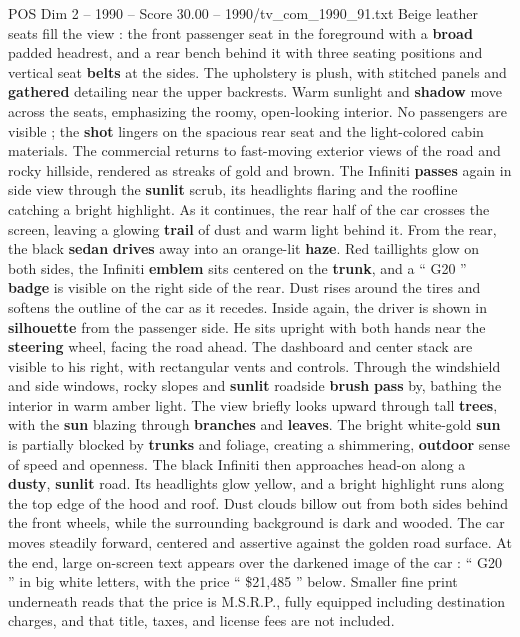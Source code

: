 \begin{textsample}{POS Dim 2 – 1990 – Score 30.00 – 1990/tv\_com\_1990\_91.txt}
Beige leather seats fill the view : the front passenger seat in the foreground with a \textbf{broad} padded headrest, and a rear bench behind it with three seating positions and vertical seat \textbf{belts} at the sides.
The upholstery is plush, with stitched panels and \textbf{gathered} detailing near the upper backrests.
Warm sunlight and \textbf{shadow} move across the seats, emphasizing the roomy, open-looking interior.
No passengers are visible ; the \textbf{shot} lingers on the spacious rear seat and the light-colored cabin materials.
The commercial returns to fast-moving exterior views of the road and rocky hillside, rendered as streaks of gold and brown.
The Infiniti \textbf{passes} again in side view through the \textbf{sunlit} scrub, its headlights flaring and the roofline catching a bright highlight.
As it continues, the rear half of the car crosses the screen, leaving a glowing \textbf{trail} of dust and warm light behind it.
From the rear, the black \textbf{sedan} \textbf{drives} away into an orange-lit \textbf{haze}.
Red taillights glow on both sides, the Infiniti \textbf{emblem} sits centered on the \textbf{trunk}, and a “ G20 ” \textbf{badge} is visible on the right side of the rear.
Dust rises around the tires and softens the outline of the car as it recedes.
Inside again, the driver is shown in \textbf{silhouette} from the passenger side.
He sits upright with both hands near the \textbf{steering} wheel, facing the road ahead.
The dashboard and center stack are visible to his right, with rectangular vents and controls.
Through the windshield and side windows, rocky slopes and \textbf{sunlit} roadside \textbf{brush} \textbf{pass} by, bathing the interior in warm amber light.
The view briefly looks upward through tall \textbf{trees}, with the \textbf{sun} blazing through \textbf{branches} and \textbf{leaves}.
The bright white-gold \textbf{sun} is partially blocked by \textbf{trunks} and foliage, creating a shimmering, \textbf{outdoor} sense of speed and openness.
The black Infiniti then approaches head-on along a \textbf{dusty}, \textbf{sunlit} road.
Its headlights glow yellow, and a bright highlight runs along the top edge of the hood and roof.
Dust clouds billow out from both sides behind the front wheels, while the surrounding background is dark and wooded.
The car moves steadily forward, centered and assertive against the golden road surface.
At the end, large on-screen text appears over the darkened image of the car : “ G20 ” in big white letters, with the price “ \$21,485 ” below.
Smaller fine print underneath reads that the price is M.S.R.P., fully equipped including destination charges, and that title, taxes, and license fees are not included.

\end{textsample}
